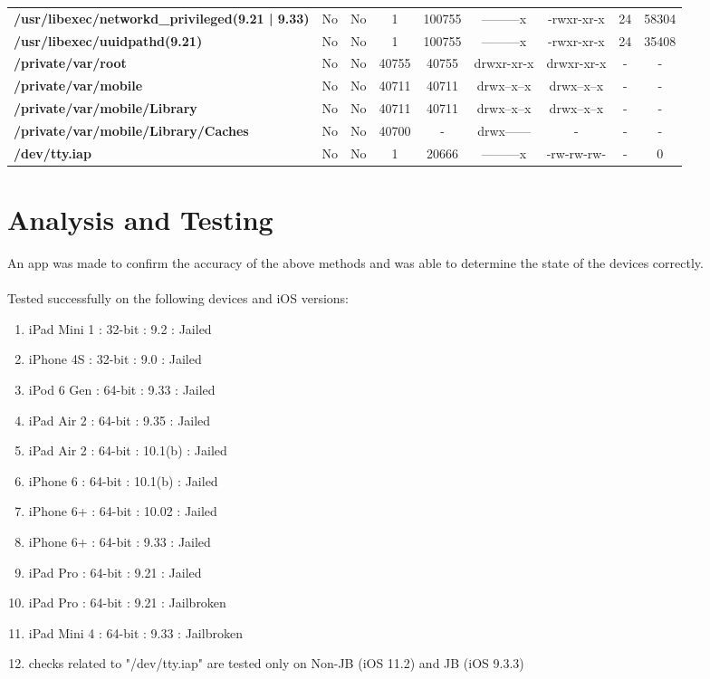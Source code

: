 \begin{center}
{\begin{tabular}{|>{\bfseries} l | C | C | C | C | C | C | C | C |}
					/usr/libexec/networkd\_privileged(9.21 | 9.33) & No & No & \color{green}1 & \color{red}100755 & \color{green}---------x & \color{red}-rwxr-xr-x & \color{green}24 & \color{red}58304\\ 
					/usr/libexec/uuidpathd(9.21) & No & No & \color{green}1 & \color{red}100755 & \color{green}---------x & \color{red}-rwxr-xr-x & \color{green}24 & \color{red}35408\\ 
					/private/var/root & No & No & 40755 & 40755 & drwxr-xr-x & drwxr-xr-x & - & -\\ 
					/private/var/mobile & No & No & 40711 & 40711 & drwx--x--x & drwx--x--x & - & -\\ 
					/private/var/mobile/Library & No & No & 40711 & 40711 & drwx--x--x & drwx--x--x & - & -\\ 
					/private/var/mobile/Library/Caches & No & No & 40700 & - & drwx------ & - & - & -\\ 
					/dev/tty.iap & No & No & 1 & 20666 &  ---------x &  -rw-rw-rw- & - & 0\\ 

			\end{tabular}
		}
	\end{center}

\newpage
\section{Analysis and Testing}
\vspace{20px}
An app was made to confirm the accuracy of the above methods and was able to determine the state of the devices correctly.\\\\
Tested successfully on the following devices and iOS versions:

\begin{enumerate}
	\item iPad Mini 1	:	32-bit	:	9.2		: 	Jailed
	\item iPhone 4S		:	32-bit	:	9.0		: 	Jailed
	\item iPod 6 Gen		:	64-bit	:	9.33		: 	Jailed
	\item iPad Air 2		:	64-bit	:	9.35		: 	Jailed
	\item iPad Air 2		:	64-bit	:	10.1(b)	: 	Jailed
	\item iPhone 6		:	64-bit	:	10.1(b)	: 	Jailed
	\item iPhone 6+		:	64-bit	:	10.02	: 	Jailed
	\item iPhone 6+   	:	64-bit	:	9.33		:	Jailed
	\item iPad Pro    	:	64-bit	:	9.21		:	Jailed
	\item iPad Pro    	:	64-bit	:	9.21		:	Jailbroken
	\item iPad Mini 4 	:	64-bit	:	9.33		: 	Jailbroken
	\item checks related to "/dev/tty.iap" are tested only on Non-JB (iOS 11.2) and JB (iOS 9.3.3)
\end{enumerate}


